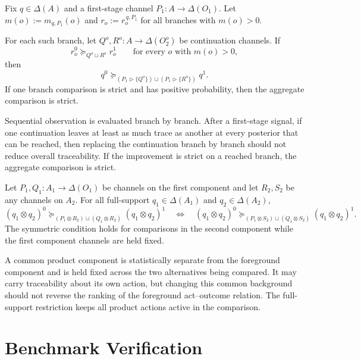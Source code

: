\documentclass[11pt,a4paper]{article}
\theoremstyle{definition}
\newcommand{\1}{\mathbf 1}
\begin{document}
\begin{description}[leftmargin=*,style=sameline]
\item[(A7) Branchwise continuation monotonicity.]
Fix $q\in\Delta(A)$ and a first-stage channel $P_1:A\to\Delta(O_1)$.  Let
$m(o):=m_{q,P_1}(o)$ and $r_o:=r_o^{\,q,P_1}$ for all branches with $m(o)>0$.

For each such branch, let $Q^o,R^o:A\to\Delta(O_2^o)$ be continuation channels.  If
\[
r_o^0\succeq_{Q^o\sqcup R^o}r_o^1
\qquad\text{for every }o\text{ with }m(o)>0,
\]
then
\[
q^0
\succeq_{(P_1\triangleright\{Q^o\})\sqcup(P_1\triangleright\{R^o\})}
q^1.
\]
If one branch comparison is strict and has positive probability, then the aggregate comparison is strict.

Sequential observation is evaluated branch by branch.  After a first-stage signal, if one continuation leaves at least as
much trace as another at every posterior that can be reached, then replacing the continuation branch by branch should not
reduce overall traceability.  If the improvement is strict on a reached branch, the aggregate comparison is strict.

\item[(A8) Independent-background separability.]
Let $P_1,Q_1:A_1\to\Delta(O_1)$ be channels on the first component and let $R_2,S_2$ be any channels on $A_2$.  For all
full-support $q_1\in\Delta(A_1)$ and $q_2\in\Delta(A_2)$,
\[
(q_1\otimes q_2)^0
\succeq_{(P_1\otimes R_2)\sqcup(Q_1\otimes R_2)}
(q_1\otimes q_2)^1
\quad\Longleftrightarrow\quad
(q_1\otimes q_2)^0
\succeq_{(P_1\otimes S_2)\sqcup(Q_1\otimes S_2)}
(q_1\otimes q_2)^1.
\]
The symmetric condition holds for comparisons in the second component while the first component channels are held fixed.

A common product component is statistically separate from the foreground component and is held fixed across the two
alternatives being compared.  It may carry traceability about its own action, but changing this common background should
not reverse the ranking of the foreground act--outcome relation.  The full-support restriction keeps all product actions
active in the comparison.

\end{description}

\section*{Benchmark Verification}
\end{document}
